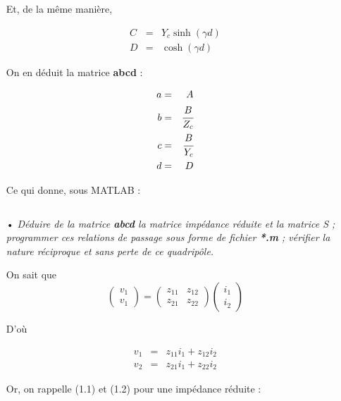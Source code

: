 \documentclass[10pt]{article}
\begin{document}
\begin{itemize}
        Et, de la même manière,

        \begin{eqnarray}
            C &=& Y_c \sinh(\gamma d) \\
            D &=& \cosh(\gamma d)
        \end{eqnarray}

        On en déduit la matrice \textbf{abcd} :

        \begin{eqnarray}
            a &=& A \\
            b &=& \cfrac{B}{Z_c} \\
            c &=& \cfrac{B}{Y_c} \\
            d &=& D
        \end{eqnarray}

        Ce qui donne, sous MATLAB :
        \inputminted[linenos]{matlab}{src/1a.m}

    \item[•] \textit{Déduire de la matrice \textbf{abcd} la matrice impédance réduite et la matrice S ; programmer ces relations de passage sous forme de fichier \textbf{*.m} ; vérifier la nature réciproque et sans perte de ce quadripôle.}

        On sait que
        \[
            \begin{pmatrix}
                v_1 \\
                v_1
            \end{pmatrix}
            =
            \begin{pmatrix}
                z_{11} & z_{12} \\
                z_{21} & z_{22}
            \end{pmatrix}
            \begin{pmatrix}
                i_1 \\
                i_2
            \end{pmatrix}
        \]

        D'où

        \begin{eqnarray}
            v_1 &=& z_{11} i_1 + z_{12} i_2 \\
            v_2 &=& z_{21} i_1 + z_{22} i_2
        \end{eqnarray}

        Or, on rappelle (1.1) et (1.2) pour une impédance réduite :


\end{itemize}
\end{document}
